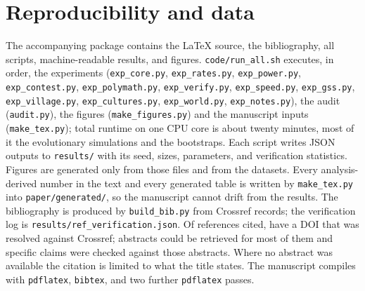 \section{Reproducibility and data}\label{app:repro}

\noindent The accompanying package contains the \LaTeX{} source, the bibliography, all scripts, machine-readable results,
and figures. \texttt{code/run\_all.sh} executes, in order, the experiments (\texttt{exp\_core.py}, \texttt{exp\_rates.py},
\texttt{exp\_power.py}, \texttt{exp\_contest.py}, \texttt{exp\_polymath.py}, \texttt{exp\_verify.py}, \texttt{exp\_speed.py},
\texttt{exp\_gss.py}, \texttt{exp\_village.py}, \texttt{exp\_cultures.py}, \texttt{exp\_world.py}, \texttt{exp\_notes.py}), the audit
(\texttt{audit.py}), the figures (\texttt{make\_figures.py}) and the manuscript inputs (\texttt{make\_tex.py}); total runtime
on one CPU core is about twenty minutes, most of it the evolutionary simulations and the bootstraps. Each script writes JSON
outputs to \texttt{results/} with its seed, sizes, parameters, and verification statistics. Figures are generated only from
those files and from the datasets. Every analysis-derived number in the text and every generated table is written
by \texttt{make\_tex.py} into \texttt{paper/generated/}, so the manuscript cannot drift from the results. The bibliography
is produced by \texttt{build\_bib.py} from Crossref records; the verification log is \texttt{results/ref\_verification.json}.
Of \RefCited{} references cited, \RefResolved{} have a DOI that was resolved against Crossref; abstracts could be retrieved
for most of them and specific claims were checked against those abstracts. Where no abstract was available the citation is
limited to what the title states. The manuscript compiles with \texttt{pdflatex}, \texttt{bibtex}, and two further
\texttt{pdflatex} passes.

